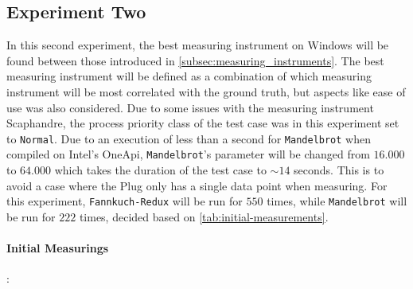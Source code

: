 \subsection{Experiment Two}\label{subsec:exp_two}

In this second experiment, the best measuring instrument on Windows will be found between those introduced in \cref{subsec:measuring_instruments}. The best measuring instrument will be defined as a combination of which measuring instrument will be most correlated with the ground truth, but aspects like ease of use was also considered. Due to some issues with the measuring instrument Scaphandre, the process priority class of the test case was in this experiment set to \texttt{Normal}. Due to an execution of less than a second for \texttt{Mandelbrot} when compiled on Intel's OneApi, \texttt{Mandelbrot}'s parameter will be changed from $16.000$ to $64.000$ which takes the duration of the test case to $\sim 14$ seconds. This is to avoid a case where the Plug only has a single data point when measuring. For this experiment, \texttt{Fannkuch-Redux} will be run for $550$ times, while \texttt{Mandelbrot} will be run for $222$ times, decided based on \cref{tab:initial-measurements}.

\paragraph{Initial Measurings}:





